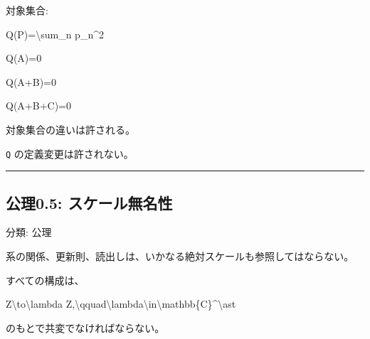 \documentclass[
  a4paper,
]{ltjsarticle}
\newenvironment{Shaded}{}{}
\newcommand{\NormalTok}[1]{#1}
\begin{document}
対象集合:

\begin{Shaded}
\begin{Highlighting}[]
\NormalTok{Q(P)=\textbackslash{}sum\_n p\_n\^{}2}
\end{Highlighting}
\end{Shaded}

\begin{Shaded}
\begin{Highlighting}[]
\NormalTok{Q(A)=0}
\end{Highlighting}
\end{Shaded}

\begin{Shaded}
\begin{Highlighting}[]
\NormalTok{Q(A+B)=0}
\end{Highlighting}
\end{Shaded}

\begin{Shaded}
\begin{Highlighting}[]
\NormalTok{Q(A+B+C)=0}
\end{Highlighting}
\end{Shaded}

対象集合の違いは許される。

\texttt{Q} の定義変更は許されない。

\begin{center}\rule{0.5\linewidth}{0.5pt}\end{center}

\subsection{公理0.5:
スケール無名性}\label{ux516cux74060.5-ux30b9ux30b1ux30fcux30ebux7121ux540dux6027}

分類: 公理

系の関係、更新則、読出しは、いかなる絶対スケールも参照してはならない。

すべての構成は、

\begin{Shaded}
\begin{Highlighting}[]
\NormalTok{Z\textbackslash{}to\textbackslash{}lambda Z,\textbackslash{}qquad\textbackslash{}lambda\textbackslash{}in\textbackslash{}mathbb\{C\}\^{}\textbackslash{}ast}
\end{Highlighting}
\end{Shaded}

のもとで共変でなければならない。
\end{document}
